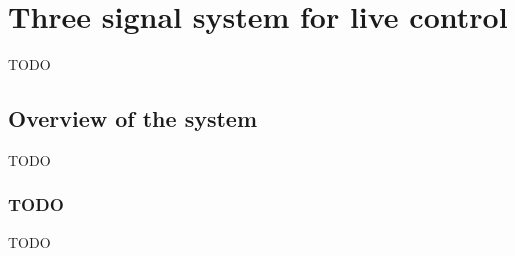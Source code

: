 
\chapter{Three signal system for live control}
\label{ch:final_system}
TODO

\section{Overview of the system}
\label{sec:final_system_overview}
TODO


\subsection{TODO}
\label{subsec:final_system_overview_XXX}
TODO

